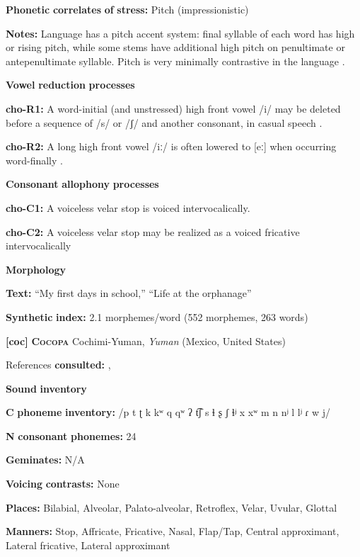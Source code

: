 \begin{styleBody}
\textbf{Phonetic} \textbf{correlates} \textbf{of} \textbf{stress:} Pitch (impressionistic)

\textbf{Notes:} Language has a pitch accent system: final syllable of each word has high or rising pitch, while some stems have additional high pitch on penultimate or antepenultimate syllable. Pitch is very minimally contrastive in the language \citep[17]{Broadwell2006}.

\textbf{Vowel} \textbf{reduction} \textbf{processes}

\textbf{cho-R1:} A word-initial (and unstressed) high front vowel /i/ may be deleted before a sequence of /s/ or /ʃ/ and another consonant, in casual speech \citep[19]{Broadwell2006}.

\textbf{cho-R2:} A long high front vowel /iː/ is often lowered to [eː] when occurring word-finally \citep[30]{Broadwell2006}.

\textbf{Consonant} \textbf{allophony} \textbf{processes}

\textbf{cho-C1:} A voiceless velar stop is voiced intervocalically. \citep[15]{Broadwell2006}

\textbf{cho-C2:}  A voiceless velar stop may be realized as a voiced fricative intervocalically \citep[15]{Broadwell2006}

\textbf{Morphology}

\textbf{Text:} “My first days in school,” “Life at the orphanage” \citep[355-360]{Broadwell2006}

\textbf{Synthetic} \textbf{index:} 2.1 morphemes/word (552 morphemes, 263 words)

\textbf{[coc]}   \textbf{\textsc{Cocopa}}    Cochimi-Yuman, \textit{Yuman} (Mexico, United States)

References \textbf{consulted:} \citet{Bendixen1980}, \citet{Crawford1966}

\textbf{Sound} \textbf{inventory}

\textbf{C} \textbf{phoneme} \textbf{inventory:} /p t ʈ k kʷ q qʷ ʔ t͡ʃ s ɬ ʂ ʃ ɬʲ x xʷ m n nʲ l lʲ ɾ w j/

\textbf{N} \textbf{consonant} \textbf{phonemes:} 24

\textbf{Geminates:} N/A

\textbf{Voicing} \textbf{contrasts:} None

\textbf{Places:} Bilabial, Alveolar, Palato-alveolar, Retroflex, Velar, Uvular, Glottal

\textbf{Manners:} Stop, Affricate, Fricative, Nasal, Flap/Tap, Central approximant, Lateral fricative, Lateral approximant


\end{styleBody}
